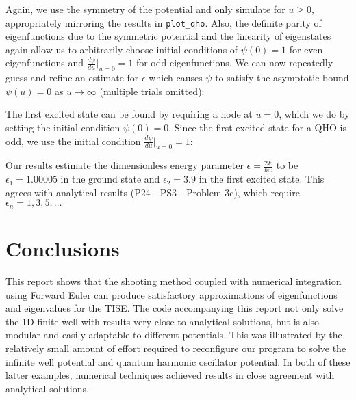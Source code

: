 \documentclass{article}
\begin{document}
Again, we use the symmetry of the potential and only simulate for $u \ge 0$,
appropriately mirroring the results in \texttt{plot\_qho}. Also, the definite
parity of eigenfunctions due to the symmetric potential and the linearity of
eigenstates again allow us to arbitrarily choose initial conditions of
$\psi(0)=1$ for even eigenfunctions and $\frac{d\psi}{du}\big|_{u=0}=1$ for odd
eigenfunctions. We can now repeatedly guess and refine an estimate for
$\epsilon$ which causes $\psi$ to satisfy the asymptotic bound $\psi(u) = 0$ as $u
\rightarrow \infty$ (multiple trials omitted):

\begin{figure}[H]
\centering
{}
\end{figure}

The first excited state can be found by requiring a node at $u = 0$, which we
do by setting the initial condition $\psi(0)=0$. Since the first excited state 
for a QHO is odd, we use the initial condition $\frac{d\psi}{du}\big|_{u=0}=1$:

\begin{figure}[H]
\centering
{}
\end{figure}

Our results estimate the dimensionless energy parameter
$\epsilon=\frac{2E}{\hbar\omega}$ to be $\epsilon_1=1.00005$ in the ground
state and $\epsilon_2=3.9$ in the first excited state. This agrees with
analytical results (P24 - PS3 - Problem 3c), which require $\epsilon_n = 1, 3,
5, \ldots$

\section{Conclusions}

This report shows that the shooting method coupled with numerical integration
using Forward Euler can produce satisfactory approximations of eigenfunctions
and eigenvalues for the TISE. The code accompanying this report not only solve
the 1D finite well with results very close to analytical solutions, but is
also modular and easily adaptable to different potentials.  This was
illustrated by the relatively small amount of effort required to reconfigure
our program to solve the infinite well potential and quantum harmonic
oscillator potential. In both of these latter examples, numerical techniques
achieved results in close agreement with analytical solutions.
\end{document}
